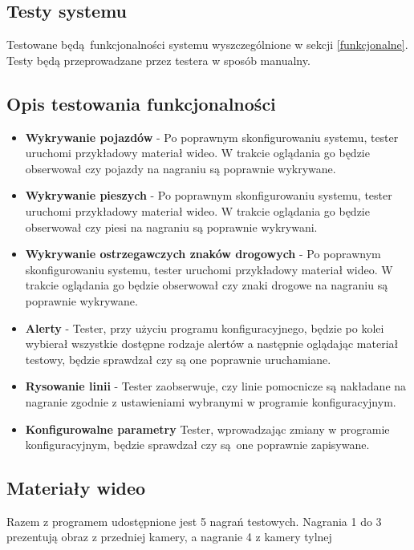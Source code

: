\subsection{Testy systemu}
Testowane będą funkcjonalności systemu wyszczególnione w sekcji \ref{funkcjonalne}. \newline
Testy będą przeprowadzane przez testera w sposób manualny.

\subsection{Opis testowania funkcjonalności}
\begin{itemize}
	\item \textbf{Wykrywanie pojazdów} - Po poprawnym skonfigurowaniu systemu, tester uruchomi przykładowy materiał wideo. W trakcie oglądania go będzie obserwował czy pojazdy na nagraniu są poprawnie wykrywane. 
	\item \textbf{Wykrywanie pieszych} - Po poprawnym skonfigurowaniu systemu, tester uruchomi przykładowy materiał wideo. W trakcie oglądania go będzie obserwował czy piesi na nagraniu są poprawnie wykrywani.
	\item \textbf{Wykrywanie ostrzegawczych znaków drogowych} - Po poprawnym skonfigurowaniu systemu, tester uruchomi przykładowy materiał wideo. W trakcie oglądania go będzie obserwował czy znaki drogowe na nagraniu są poprawnie wykrywane.
	\item \textbf{Alerty} - Tester, przy użyciu programu konfiguracyjnego, będzie po kolei wybierał wszystkie dostępne rodzaje alertów a następnie oglądając materiał testowy, będzie sprawdzał czy są one poprawnie uruchamiane.
	\item \textbf{Rysowanie linii} - Tester zaobserwuje, czy linie pomocnicze są nakładane na nagranie zgodnie z ustawieniami wybranymi w programie konfiguracyjnym.
	\item \textbf{Konfigurowalne parametry} Tester, wprowadzając zmiany w programie konfiguracyjnym, będzie sprawdzał czy są one poprawnie zapisywane.
\end{itemize}


\subsection{Materiały wideo}
Razem z programem udostępnione jest 5 nagrań testowych.
\newline
Nagrania 1 do 3 prezentują obraz z przedniej kamery, a nagranie 4 z kamery tylnej

